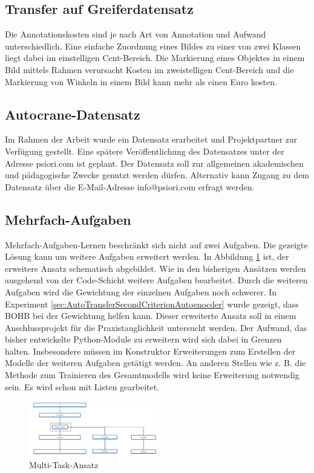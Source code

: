 	\subsection{Transfer auf Greiferdatensatz}
	\label{subsec:TransferGreiferDatensatz}
 	Die Annotationskosten sind je nach Art von Annotation und Aufwand unterschiedlich. Eine einfache Zuordnung eines Bildes zu einer von zwei Klassen liegt dabei im einstelligen Cent-Bereich. Die Markierung eines Objektes in einem Bild mittels Rahmen verursacht Kosten im zweistelligen Cent-Bereich und die Markierung von Winkeln in einem Bild kann mehr als einen Euro kosten. 		

	
	\subsection{Autocrane-Datensatz}
	\label{subsec:AutocraneDatensatz}	
	Im Rahmen der Arbeit wurde ein Datensatz erarbeitet und Projektpartner zur Verfügung gestellt. Eine spätere Veröffentlichung des Datensatzes unter der Adresse psiori.com ist geplant. Der Datensatz soll zur allgemeinen akademischen und pädagogische Zwecke genutzt werden dürfen. Alternativ kann Zugang zu dem Datensatz über die E-Mail-Adresse info@psiori.com erfragt werden.

	\subsection{Mehrfach-Aufgaben}
	\label{subsec:MehrfacheAufgaben}
	Mehrfach-Aufgaben-Lernen beschränkt sich nicht auf zwei Aufgaben. Die gezeigte Lösung kann um weitere Aufgaben erweitert werden. In Abbildung \ref{img:AusblickMultiTaskAnsatz} ist, der erweitere Ansatz schematisch abgebildet. Wie in den bisherigen Ansätzen werden ausgehend von der Code-Schicht weitere Aufgaben bearbeitet. Durch die weiteren Aufgaben wird die Gewichtung der einzelnen Aufgaben noch schwerer. In Experiment \ref{sec:AutoTransferSecondCriterionAutoenocder}  wurde gezeigt, dass BOHB bei der Gewichtung helfen kann. Dieser erweiterte Ansatz soll in einem Anschlussprojekt für die Praxistauglichkeit untersucht werden. Der Aufwand, das bisher entwickelte Python-Module zu erweitern wird sich dabei in Grenzen halten. Insbesondere müssen im Konstruktor Erweiterungen zum Erstellen der Modelle der weiteren Aufgaben getätigt werden. An anderen Stellen wie z. B. die Methode zum Trainieren des Gesamtmodells wird keine Erweiterung notwendig sein. Es wird schon mit Listen gearbeitet.   
	\begin{figure}[h]
		\centering
		\includegraphics[width=0.5\textwidth, center]{bilder/FazitUndAusblick/MultiTaskAnsatz.PNG}
		\caption[Ausblick Multi-Task-Ansatz]{Multi-Task-Ansatz}
		\label{img:AusblickMultiTaskAnsatz}
	\end{figure}


